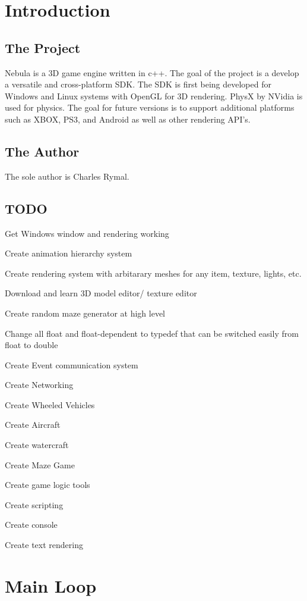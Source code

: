 \hypertarget{main_intro}{}\section{Introduction}\label{main_intro}
\hypertarget{main_proj}{}\subsection{The Project}\label{main_proj}
Nebula is a 3D game engine written in c++. The goal of the project is a develop a versatile and cross-\/platform SDK. The SDK is first being developed for Windows and Linux systems with OpenGL for 3D rendering. PhysX by NVidia is used for physics. The goal for future versions is to support additional platforms such as XBOX, PS3, and Android as well as other rendering API's.\hypertarget{main_author}{}\subsection{The Author}\label{main_author}
The sole author is Charles Rymal.\hypertarget{main_TODO}{}\subsection{TODO}\label{main_TODO}

\begin{DoxyItemize}
\item Get Windows window and rendering working
\item Create animation hierarchy system
\item Create rendering system with arbitarary meshes for any item, texture, lights, etc.
\item Download and learn 3D model editor/ texture editor
\item Create random maze generator at high level
\item Change all float and float-\/dependent to typedef that can be switched easily from float to double
\item Create Event communication system
\item Create Networking
\item Create Wheeled Vehicles
\item Create Aircraft
\item Create watercraft
\item Create Maze Game
\item Create game logic tools
\item Create scripting
\item Create console
\begin{DoxyItemize}
\item Create text rendering
\end{DoxyItemize}
\end{DoxyItemize}\hypertarget{main_mainloop}{}\section{Main Loop}\label{main_mainloop}


